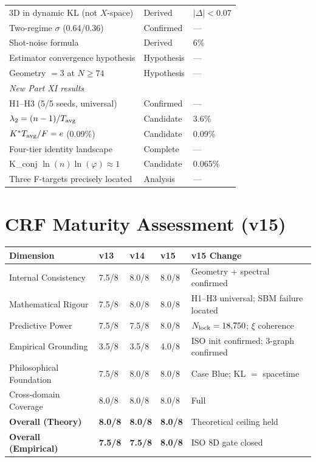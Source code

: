\documentclass[12pt, a4paper]{article}
\begin{document}
\begin{longtable}{p{8cm}p{2.8cm}p{1.8cm}}
3D in dynamic KL (not $X$-space) & Derived & $|\Delta|<0.07$\\
Two-regime $\sigma$ (0.64/0.36) & Confirmed & ---\\
Shot-noise formula & Derived & 6\%\\
Estimator convergence hypothesis & Hypothesis & ---\\
Geometry $=3$ at $N\geq 74$ & Hypothesis & ---\\
\midrule
\multicolumn{3}{l}{\textit{New Part XI results}}\\
H1--H3 (5/5 seeds, universal) & Confirmed & ---\\
$\lambda_2=(n-1)/T_{\rm avg}$ & Candidate & 3.6\%\\
$K^*T_{\rm avg}/F=e$ (0.09\%) & Candidate & 0.09\%\\
Four-tier identity landscape & Complete & ---\\
K\_conj $\ln(n)\ln(\varphi)\approx 1$ & Candidate & 0.065\%\\
Three F-targets precisely located & Analysis & ---\\
\end{longtable}
\vspace{-\parskip}

\section{CRF Maturity Assessment (v15)}

\begin{center}
{\small
\renewcommand{\arraystretch}{1.35}
\begin{tabular}{p{4cm} p{1.1cm} p{1.1cm} p{1.1cm} p{4.2cm}}
\toprule
\textbf{Dimension} & \textbf{v13} & \textbf{v14} & \textbf{v15} & \textbf{v15 Change}\\
\midrule
Internal Consistency & 7.5/8 & 8.0/8 & 8.0/8 & Geometry + spectral confirmed\\
Mathematical Rigour & 7.5/8 & 8.0/8 & 8.0/8 & H1--H3 universal; SBM failure located\\
Predictive Power & 7.5/8 & 7.5/8 & 8.0/8 & $N_{\rm lock}=18{,}750$; $\xi$ coherence\\
Empirical Grounding & 3.5/8 & 3.5/8 & 4.0/8 & ISO init confirmed; 3-graph confirmed\\
Philosophical Foundation & 7.5/8 & 8.0/8 & 8.0/8 & Case Blue; KL $=$ spacetime\\
Cross-domain Coverage & 8.0/8 & 8.0/8 & 8.0/8 & Full\\
\midrule
\textbf{Overall (Theory)} & \textbf{8.0/8} & \textbf{8.0/8} & \textbf{8.0/8} & Theoretical ceiling held\\
\textbf{Overall (Empirical)} & \textbf{7.5/8} & \textbf{7.5/8} & \textbf{8.0/8} & ISO 8D gate closed\\
\bottomrule
\end{tabular}
}
\end{center}
\end{document}
